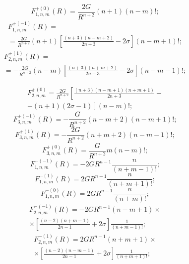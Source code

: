 \begin{russian}
\begin{equation}
F_{1,n,m}^{ + (0)}(R) = \frac{{2G}}{{{R^{n + 2}}}}(n + 1)(n - m)!;
\label{eq:8:13a}
\end{equation}
\begin{multline}
F_{1,n,m}^{ + ( - 1)}(R) = \\
= \frac{{2G}}{{{R^{n + 2}}}}(n + 1)\left[ {\frac{{(n + 3)(n - m + 2)}}{{2n + 3}} - 2\sigma } \right](n - m + 1)!;
\label{eq:8:13b}
\end{multline}
\begin{multline}
F_{2,n,m}^{ + (1)}(R) =  \\
= - \frac{{2G}}{{{R^{n + 2}}}}(n - m)\left[ {\frac{{(n + 3)(n + m + 2)}}{{2n + 3}} - 2\sigma } \right](n - m - 1)!;
\label{eq:8:13c}
\end{multline}

\begin{multline}
F_{2,n,m}^{ + (0)} = \frac{{2G}}{{{R^{n + 2}}}}\left[ {\frac{{(n + 3)(n - m + 1)(n + m + 1)}}{{2n + 3}} - } \right.\\
\left. { - (n + 1)(2\sigma  - 1)} \right](n - m)!;
\label{eq:8:14a}
\end{multline}
\begin{equation}
F_{3,n,m}^{ + ( - 1)}(R) =  - \frac{G}{{{R^{n + 2}}}}(n - m + 2)(n - m + 1)!;
\label{eq:8:14b}
\end{equation}
\begin{equation}
F_{3,n,m}^{ + (1)}(R) =  - \frac{{2G}}{{{R^{n + 2}}}}(n + m + 2)(n - m - 1)!;
\label{eq:8:15a}
\end{equation}
\begin{equation}
F_{3,n,m}^{ + (0)}(R) = \frac{G}{R^{n+2}}m(n - m)!;
\label{eq:8:15b}
\end{equation}
\begin{equation}
F_{1,n,m}^{ - ( - 1)}(R) =  - 2G{R^{n - 1}}\frac{n}{{(n + m - 1)!}};
\label{eq:8:16a}
\end{equation}
\begin{equation}
F_{1,n,m}^{ - (1)}(R) = 2G{R^{n - 1}}\frac{n}{{(n + m + 1)!}};
\label{eq:8:16b}
\end{equation}
\begin{equation}
F_{1,n,m}^{ - (0)}(R) = 2G{R^{n - 1}}\frac{n}{{(n + m)!}};
\label{eq:8:17a}
\end{equation}
\begin{multline}
F_{2,n,m}^{ - ( - 1)}(R) =  - 2G{R^{n - 1}}(n - m + 1) \times \\
\times \left[ {\frac{{(n - 2)(n + m - 1)}}{{2n - 1}} + 2\sigma } \right]\frac{1}{{(n + m - 1)!}};
\label{eq:8:17b}
\end{multline}
\begin{multline}
F_{2,n,m}^{ - (1)}(R) = 2G{R^{n - 1}}(n + m + 1)\times \\
\times\left[ {\frac{{(n - 2)(n - m - 1)}}{{2n - 1}} + 2\sigma } \right]\frac{1}{{(n + m + 1)!}};
\label{eq:8:17c}
\end{multline}


\end{russian}
